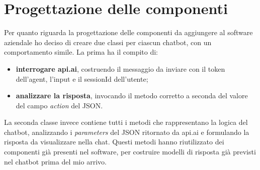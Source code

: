 \section{Progettazione delle componenti}
Per quanto riguarda la progettazione delle componenti da aggiungere al software aziendale ho deciso di creare due classi per ciascun \gls{chatbot}, con un comportamento simile. La prima ha il compito di:
\begin{itemize}
	\item \textbf{interrogare api.ai}, costruendo il messaggio da inviare con il token dell'agent, l'input e il sessionId dell'utente;
	\item \textbf{analizzare la risposta}, invocando il metodo corretto a seconda del valore del campo \emph{action} del \gls{JSON}.
\end{itemize}
La seconda classe invece contiene tutti i metodi che rappresentano la logica del \gls{chatbot}, analizzando i \emph{parameters} del \gls{JSON} ritornato da api.ai e formulando la risposta da visualizzare nella chat. Questi metodi hanno riutilizzato dei componenti già presenti nel software, per costruire modelli di risposta già previsti nel \gls{chatbot} prima del mio arrivo.


